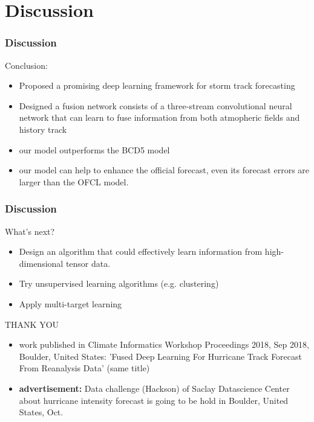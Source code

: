 \documentclass{beamer}
\begin{document}
\section{Discussion}
\begin{frame}
\frametitle{Discussion}
\large{Conclusion:}

\begin{itemize}
	\item  Proposed a promising deep learning framework for storm track forecasting
	\item  Designed a fusion network consists of a three-stream convolutional neural network that can learn to fuse information from both atmopheric fields and history track
	\item  our model outperforms the BCD5 model
	\item  our model can help to enhance the official forecast, even its forecast errors are larger than the OFCL model.
\end{itemize} 
\end{frame}

\begin{frame}
\frametitle{Discussion}
\large{What's next?}

\begin{itemize}
	\item  Design an algorithm that could effectively learn information from high-dimensional tensor data.
	\item  Try unsupervised learning algorithms (e.g. clustering)
	\item  Apply multi-target learning
\end{itemize} 
\end{frame}

\begin{frame}
\Huge{\centerline{THANK YOU}}
\small
\begin{itemize}
	\item work published in Climate Informatics Workshop Proceedings 2018, Sep 2018, Boulder, United States: 'Fused Deep Learning For Hurricane Track Forecast From Reanalysis Data' (same title)
	\item \textbf{advertisement:} Data challenge (Hackson) of Saclay Datascience Center about hurricane intensity forecast is going to be hold in Boulder, United States, Oct.
\end{itemize}
\end{frame}


   

\end{document}
